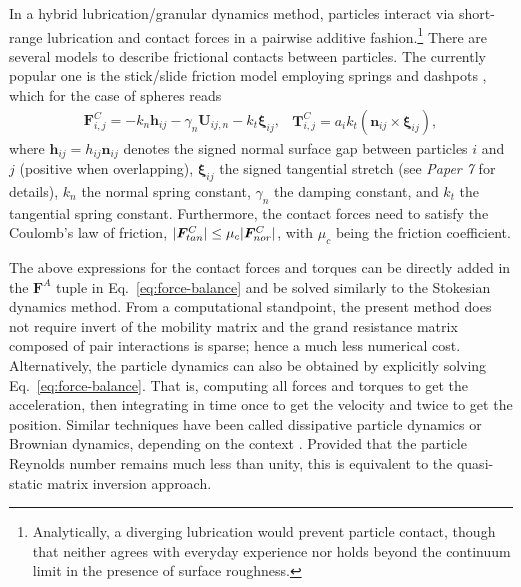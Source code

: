 In a hybrid lubrication/granular dynamics method, particles interact via short-range lubrication and contact forces in a pairwise additive fashion.\footnote{Analytically, a diverging lubrication would prevent particle contact, though that neither agrees with everyday experience nor holds beyond the continuum limit in the presence of surface roughness.}
There are several models to describe frictional contacts between particles. The currently popular one is the 
stick/slide friction model employing springs and dashpots \citep{Luding2008}, which for the case of spheres reads
\begin{subequations} \label{eq:hlcd-contact}
  \begin{equation} 
    \begin{aligned}
      {\bm F}^C_{i,j} = -k_n {\bm h}_{ij}  - \gamma_n \bm{U}_{ij,n} - k_t {\bm \xi}_{ij},
    \end{aligned}
    \label{col F}
  \end{equation}
  \begin{equation} 
    \begin{aligned}
      {\bm T}^C_{i,j} = a_{i} k_t ({\bm n}_{ij} \times {\bm \xi}_{ij}),
    \end{aligned}
  \end{equation}
\end{subequations}
where ${\bm h}_{ij}=h_{ij}{\bm n}_{ij}$ denotes the signed normal surface gap between particles $i$ and $j$ (positive when overlapping),
${\bm \xi}_{ij}$ the signed tangential stretch (see \emph{Paper 7} for details),
$k_n$ the normal spring constant,
$\gamma_n$ the damping constant,
and $k_t$ the tangential spring constant.
Furthermore, the contact forces need to satisfy the Coulomb's law of friction, \ie $\lvert\bm{F}^C_{tan}\rvert \leq \mu_c\lvert\bm{F}^C_{nor}\rvert$, with $\mu_c$ being the friction coefficient. 

The above expressions for the contact forces and torques can be directly added in the ${\bm F}^A$ tuple in Eq.\ \eqref{eq:force-balance} and be solved similarly to the Stokesian dynamics method.
From a computational standpoint, the present method does not require invert of the mobility matrix and the grand resistance matrix composed of pair interactions is sparse; hence a much less numerical cost.
Alternatively, the particle dynamics can also be obtained by explicitly solving Eq.\ \eqref{eq:force-balance}. That is, computing all forces and torques to get the acceleration, then integrating in time once to get the velocity and twice to get the position.
Similar techniques have been called dissipative particle dynamics or Brownian dynamics, depending on the context \citep{Hoogerbrugge_1992, Groot_Warren_1997}.
Provided that the particle Reynolds number remains much less than unity, this is equivalent to the quasi-static matrix inversion approach.



